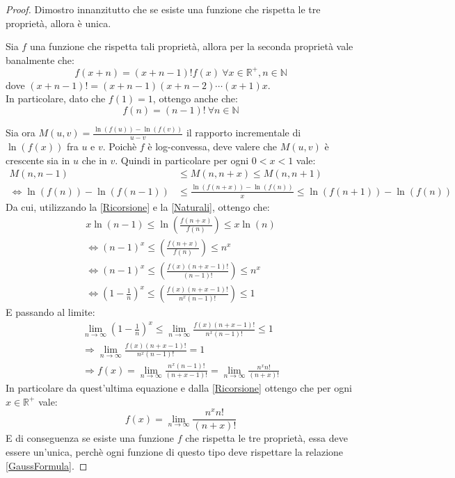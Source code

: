 \begin{proof}
Dimostro innanzitutto che se esiste una funzione che rispetta le tre proprietà, allora è unica.

Sia $f$ una funzione che rispetta tali proprietà, allora per la seconda proprietà vale banalmente che:
\begin{equation}
 \label{Ricorsione}
 f(x+n)=(x+n-1)!f(x)\ \forall x\in \mathbb{R}^+, n\in\mathbb{N}
\end{equation}
dove $(x+n-1)!=(x+n-1)(x+n-2)\cdots(x+1)x$.\\
In particolare, dato che $f(1)=1$, ottengo anche che:
\begin{equation}
 \label{Naturali}
 f(n)=(n-1)!\ \forall n\in \mathbb{N}
\end{equation}

Sia ora $M(u,v)=\frac{\ln(f(u))-\ln(f(v))}{u-v}$ il rapporto incrementale
di $\ln(f(x))$ fra $u$ e $v$. Poichè $f$ è log-convessa, deve valere che $M(u,v)$ è crescente sia in $u$ che in $v$.
Quindi in particolare per ogni $0<x<1$ vale:
\begin{equation*}
 \begin{split}
  M(n,n-1) & \le M(n,n+x) \le M(n,n+1) \\
  \iff \ln(f(n))-\ln(f(n-1)) & \le \frac{\ln(f(n+x))-\ln(f(n))}{x} \le \ln(f(n+1))-\ln(f(n)) 
  \end{split}
\end{equation*}
Da cui, utilizzando la \cref{Ricorsione} e la \cref{Naturali}, ottengo che:
\begin{gather*}
  x \ln(n-1) \le \ln \left( \frac{f(n+x)}{f(n)} \right) \le x\ln(n)\\
  \iff (n-1)^x \le \left( \frac{f(n+x)}{f(n)} \right) \le n^x \\
  \iff (n-1)^x \le \left( \frac{f(x)(n+x-1)!}{(n-1)!} \right) \le n^x \\
  \iff \left(1-\frac{1}{n}\right)^x \le \left( \frac{f(x)(n+x-1)!}{n^x(n-1)!} \right) \le 1
\end{gather*}
E passando al limite:
 \begin{gather*}
  \lim_{n\rightarrow \infty} \left(1-\frac{1}{n}\right)^x \le \lim_{n\rightarrow \infty}  \frac{f(x)(n+x-1)!}{n^x(n-1)!} \le 1 \\
  \Longrightarrow \lim_{n\rightarrow \infty} \frac{f(x)(n+x-1)!}{n^x(n-1)!}  = 1 \\
  \Longrightarrow f(x) = \lim_{n\rightarrow \infty} \frac{n^x(n-1)!}{(n+x-1)!}=\lim_{n\rightarrow \infty} \frac{n^xn!}{(n+x)!}
 \end{gather*}
In particolare da quest'ultima equazione e dalla \cref{Ricorsione} ottengo che per ogni $x\in\mathbb{R}^+$ vale:
\begin{equation}
\label{GaussFormula}
 f(x)=\lim_{n\rightarrow \infty} \frac{n^xn!}{(n+x)!}
\end{equation}
E di conseguenza se esiste una funzione $f$ che rispetta le tre proprietà, essa deve essere un'unica, perchè ogni
funzione di questo tipo deve rispettare la relazione \cref{GaussFormula}.


\end{proof}
